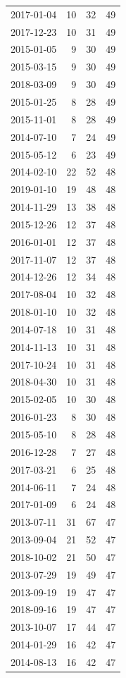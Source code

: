 \begin{tabular}{lrrr}
2017-01-04 & 10 & 32 & 49 \\
2017-12-23 & 10 & 31 & 49 \\
2015-01-05 & 9 & 30 & 49 \\
2015-03-15 & 9 & 30 & 49 \\
2018-03-09 & 9 & 30 & 49 \\
2015-01-25 & 8 & 28 & 49 \\
2015-11-01 & 8 & 28 & 49 \\
2014-07-10 & 7 & 24 & 49 \\
2015-05-12 & 6 & 23 & 49 \\
2014-02-10 & 22 & 52 & 48 \\
2019-01-10 & 19 & 48 & 48 \\
2014-11-29 & 13 & 38 & 48 \\
2015-12-26 & 12 & 37 & 48 \\
2016-01-01 & 12 & 37 & 48 \\
2017-11-07 & 12 & 37 & 48 \\
2014-12-26 & 12 & 34 & 48 \\
2017-08-04 & 10 & 32 & 48 \\
2018-01-10 & 10 & 32 & 48 \\
2014-07-18 & 10 & 31 & 48 \\
2014-11-13 & 10 & 31 & 48 \\
2017-10-24 & 10 & 31 & 48 \\
2018-04-30 & 10 & 31 & 48 \\
2015-02-05 & 10 & 30 & 48 \\
2016-01-23 & 8 & 30 & 48 \\
2015-05-10 & 8 & 28 & 48 \\
2016-12-28 & 7 & 27 & 48 \\
2017-03-21 & 6 & 25 & 48 \\
2014-06-11 & 7 & 24 & 48 \\
2017-01-09 & 6 & 24 & 48 \\
2013-07-11 & 31 & 67 & 47 \\
2013-09-04 & 21 & 52 & 47 \\
2018-10-02 & 21 & 50 & 47 \\
2013-07-29 & 19 & 49 & 47 \\
2013-09-19 & 19 & 47 & 47 \\
2018-09-16 & 19 & 47 & 47 \\
2013-10-07 & 17 & 44 & 47 \\
2014-01-29 & 16 & 42 & 47 \\
2014-08-13 & 16 & 42 & 47 \\

\end{tabular}
